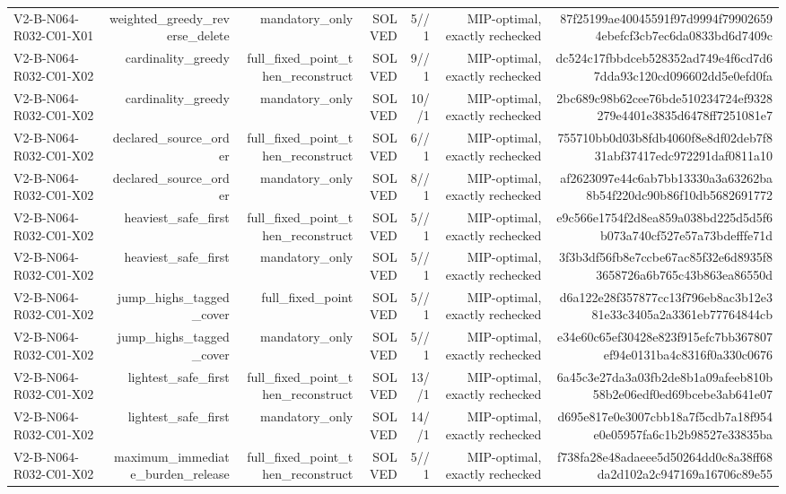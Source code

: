 {\begin{longtable}{lrrrrrr}
V2-B-N064-R032-C01-X01 & weighted\_greedy\_reverse\_delete & mandatory\_only & SOLVED & 5//1 & MIP-optimal, exactly rechecked & 87f25199ae40045591f97d9994f799026594ebefcf3cb7ec6da0833bd6d7409c \\
V2-B-N064-R032-C01-X02 & cardinality\_greedy & full\_fixed\_point\_then\_reconstruct & SOLVED & 9//1 & MIP-optimal, exactly rechecked & dc524c17fbbdceb528352ad749e4f6cd7d67dda93c120cd096602dd5e0efd0fa \\
V2-B-N064-R032-C01-X02 & cardinality\_greedy & mandatory\_only & SOLVED & 10//1 & MIP-optimal, exactly rechecked & 2bc689c98b62cee76bde510234724ef9328279e4401e3835d6478ff7251081e7 \\
V2-B-N064-R032-C01-X02 & declared\_source\_order & full\_fixed\_point\_then\_reconstruct & SOLVED & 6//1 & MIP-optimal, exactly rechecked & 755710bb0d03b8fdb4060f8e8df02deb7f831abf37417edc972291daf0811a10 \\
V2-B-N064-R032-C01-X02 & declared\_source\_order & mandatory\_only & SOLVED & 8//1 & MIP-optimal, exactly rechecked & af2623097e44c6ab7bb13330a3a63262ba8b54f220dc90b86f10db5682691772 \\
V2-B-N064-R032-C01-X02 & heaviest\_safe\_first & full\_fixed\_point\_then\_reconstruct & SOLVED & 5//1 & MIP-optimal, exactly rechecked & e9c566e1754f2d8ea859a038bd225d5d5f6b073a740cf527e57a73bdefffe71d \\
V2-B-N064-R032-C01-X02 & heaviest\_safe\_first & mandatory\_only & SOLVED & 5//1 & MIP-optimal, exactly rechecked & 3f3b3df56fb8e7ccbe67ac85f32e6d8935f83658726a6b765c43b863ea86550d \\
V2-B-N064-R032-C01-X02 & jump\_highs\_tagged\_cover & full\_fixed\_point & SOLVED & 5//1 & MIP-optimal, exactly rechecked & d6a122e28f357877cc13f796eb8ac3b12e381e33c3405a2a3361eb77764844cb \\
V2-B-N064-R032-C01-X02 & jump\_highs\_tagged\_cover & mandatory\_only & SOLVED & 5//1 & MIP-optimal, exactly rechecked & e34e60c65ef30428e823f915efc7bb367807ef94e0131ba4c8316f0a330c0676 \\
V2-B-N064-R032-C01-X02 & lightest\_safe\_first & full\_fixed\_point\_then\_reconstruct & SOLVED & 13//1 & MIP-optimal, exactly rechecked & 6a45c3e27da3a03fb2de8b1a09afeeb810b58b2e06edf0ed69bcebe3ab641e07 \\
V2-B-N064-R032-C01-X02 & lightest\_safe\_first & mandatory\_only & SOLVED & 14//1 & MIP-optimal, exactly rechecked & d695e817e0e3007cbb18a7f5cdb7a18f954e0e05957fa6c1b2b98527e33835ba \\
V2-B-N064-R032-C01-X02 & maximum\_immediate\_burden\_release & full\_fixed\_point\_then\_reconstruct & SOLVED & 5//1 & MIP-optimal, exactly rechecked & f738fa28e48adaeee5d50264dd0c8a38ff68da2d102a2c947169a16706c89e55 \\

\end{longtable}}
